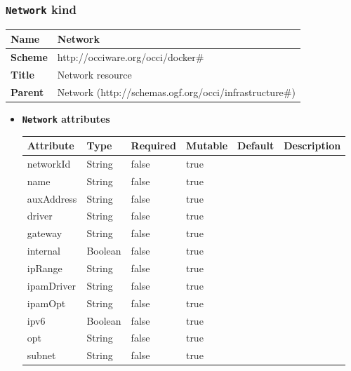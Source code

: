 \subsubsection{\texttt{Network} kind}
\begin{center}
\begin{tabular}{|l|l|}
  \hline
  \textbf{Name} & Network \\
  \hline  
  \textbf{Scheme} & http://occiware.org/occi/docker\# \\
  \hline
  \textbf{Title} & Network resource \\
  \hline
  \textbf{Parent} & Network (http://schemas.ogf.org/occi/infrastructure\#) \\
  \hline
\end{tabular}
\end{center}
\begin{itemize}
\item \textbf{\texttt{Network} attributes}

\begin{tabularx}{\textwidth}{|l|l|p{1.4cm}|p{1.3cm}|l|X|}
  \hline
  \textbf{Attribute} & \textbf{Type} & \textbf{Required} & \textbf{Mutable} & \textbf{Default} & \textbf{Description} \\
  \hline  
  networkId & String & false & true &  &  \\
  \hline
  name & String & false & true &  &  \\
  \hline
  auxAddress & String & false & true &  &  \\
  \hline
  driver & String & false & true &  &  \\
  \hline
  gateway & String & false & true &  &  \\
  \hline
  internal & Boolean & false & true &  &  \\
  \hline
  ipRange & String & false & true &  &  \\
  \hline
  ipamDriver & String & false & true &  &  \\
  \hline
  ipamOpt & String & false & true &  &  \\
  \hline
  ipv6 & Boolean & false & true &  &  \\
  \hline
  opt & String & false & true &  &  \\
  \hline
  subnet & String & false & true &  &  \\
  \hline
\end{tabularx}
\end{itemize}



